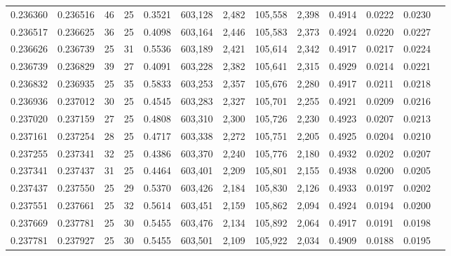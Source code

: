 \begin{tabular}{rrrrrrrrrrrrr}
0.236360 & 0.236516 &  46 &  25 &                                     0.3521 & 603,128 &   2,482 & 105,558 &   2,398 & 0.4914 & 0.0222 & 0.0230 \\
0.236517 & 0.236625 &  36 &  25 &                                     0.4098 & 603,164 &   2,446 & 105,583 &   2,373 & 0.4924 & 0.0220 & 0.0227 \\
0.236626 & 0.236739 &  25 &  31 &                                     0.5536 & 603,189 &   2,421 & 105,614 &   2,342 & 0.4917 & 0.0217 & 0.0224 \\
0.236739 & 0.236829 &  39 &  27 &                                     0.4091 & 603,228 &   2,382 & 105,641 &   2,315 & 0.4929 & 0.0214 & 0.0221 \\
0.236832 & 0.236935 &  25 &  35 &                                     0.5833 & 603,253 &   2,357 & 105,676 &   2,280 & 0.4917 & 0.0211 & 0.0218 \\
0.236936 & 0.237012 &  30 &  25 &                                     0.4545 & 603,283 &   2,327 & 105,701 &   2,255 & 0.4921 & 0.0209 & 0.0216 \\
0.237020 & 0.237159 &  27 &  25 &                                     0.4808 & 603,310 &   2,300 & 105,726 &   2,230 & 0.4923 & 0.0207 & 0.0213 \\
0.237161 & 0.237254 &  28 &  25 &                                     0.4717 & 603,338 &   2,272 & 105,751 &   2,205 & 0.4925 & 0.0204 & 0.0210 \\
0.237255 & 0.237341 &  32 &  25 &                                     0.4386 & 603,370 &   2,240 & 105,776 &   2,180 & 0.4932 & 0.0202 & 0.0207 \\
0.237341 & 0.237437 &  31 &  25 &                                     0.4464 & 603,401 &   2,209 & 105,801 &   2,155 & 0.4938 & 0.0200 & 0.0205 \\
0.237437 & 0.237550 &  25 &  29 &                                     0.5370 & 603,426 &   2,184 & 105,830 &   2,126 & 0.4933 & 0.0197 & 0.0202 \\
0.237551 & 0.237661 &  25 &  32 &                                     0.5614 & 603,451 &   2,159 & 105,862 &   2,094 & 0.4924 & 0.0194 & 0.0200 \\
0.237669 & 0.237781 &  25 &  30 &                                     0.5455 & 603,476 &   2,134 & 105,892 &   2,064 & 0.4917 & 0.0191 & 0.0198 \\
0.237781 & 0.237927 &  25 &  30 &                                     0.5455 & 603,501 &   2,109 & 105,922 &   2,034 & 0.4909 & 0.0188 & 0.0195 \\

\end{tabular}

